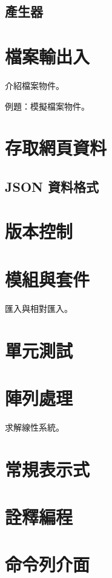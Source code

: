 \documentclass[a4paper,12pt]{book}
\theoremstyle{definition}
\begin{document}
\section{產生器}

\chapter{檔案輸出入}
%
\label{c:file}

介紹檔案物件。

例題：模擬檔案物件。

\chapter{存取網頁資料}
%
\label{c:web}

\section{JSON 資料格式}

\chapter{版本控制}
%
\label{c:version}

\chapter{模組與套件}
%
\label{c:module}

匯入與相對匯入。

\chapter{單元測試}
%
\label{c:unittest}

\chapter{陣列處理}
%
\label{c:array}

求解線性系統。

\chapter{常規表示式}
%
\label{c:regexp}

\chapter{詮釋編程}
%
\label{c:meta}

\chapter{命令列介面}
%
\label{c:cmdline}
\end{document}
